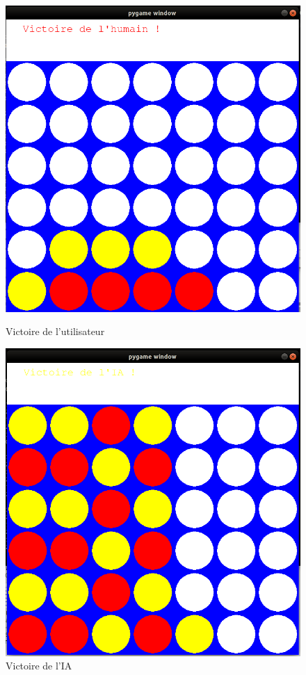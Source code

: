 \documentclass[a4paper]{article}
\begin{document}
\begin{figure}[h!]
   \begin{minipage}[c]{0.60\linewidth}
      \centering \includegraphics[scale=0.15]{humanv.png}
      \caption{Victoire de l'utilisateur}
 
   \end{minipage}\hfill
   \begin{minipage}[c]{0.60\linewidth}   
      \centering \includegraphics[scale=0.15]{iav.png}
      \caption{Victoire de l'IA}
  

\end{minipage}
\end{figure}
\end{document}
